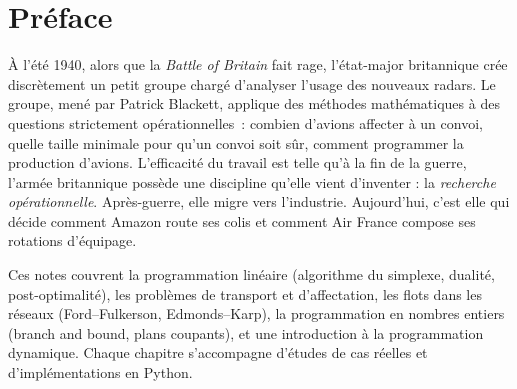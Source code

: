 \documentclass[12pt,a4paper,twoside]{book}
\theoremstyle{definition}
\theoremstyle{plain}
\theoremstyle{remark}
\begin{document}
\begin{titlepage}
\end{titlepage}

\frontmatter
\tableofcontents


\chapter*{Pr\'eface}

\`A l'\'et\'e 1940, alors que la \emph{Battle of Britain} fait rage, l'\'etat-major britannique cr\'ee discr\`etement un petit groupe charg\'e d'analyser l'usage des nouveaux radars. Le groupe, men\'e par Patrick Blackett, applique des m\'ethodes math\'ematiques \`a des questions strictement op\'erationnelles~: combien d'avions affecter \`a un convoi, quelle taille minimale pour qu'un convoi soit s\^ur, comment programmer la production d'avions. L'efficacit\'e du travail est telle qu'\`a la fin de la guerre, l'arm\'ee britannique poss\`ede une discipline qu'elle vient d'inventer : la \emph{recherche op\'erationnelle}. Apr\`es-guerre, elle migre vers l'industrie. Aujourd'hui, c'est elle qui d\'ecide comment Amazon route ses colis et comment Air France compose ses rotations d'\'equipage.

\medskip

Ces notes couvrent la programmation lin\'eaire (algorithme du simplexe, dualit\'e, post-optimalit\'e), les probl\`emes de transport et d'affectation, les flots dans les r\'eseaux (Ford--Fulkerson, Edmonds--Karp), la programmation en nombres entiers (branch and bound, plans coupants), et une introduction \`a la programmation dynamique. Chaque chapitre s'accompagne d'\'etudes de cas r\'eelles et d'impl\'ementations en Python.
\end{document}
